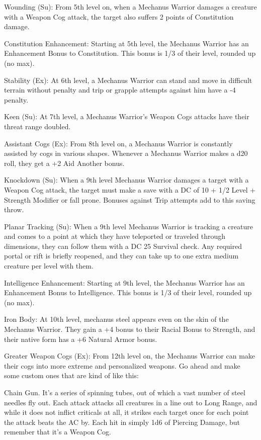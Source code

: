 Wounding (Su): From 5th level on, when a Mechanus Warrior damages a creature with a Weapon Cog attack, the target also suffers 2 points of Constitution damage.

Constitution Enhancement: Starting at 5th level, the Mechanus Warrior has an Enhancement Bonus to Constitution. This bonus is 1/3 of their level, rounded up (no max).

Stability (Ex): At 6th level, a Mechanus Warrior can stand and move in difficult terrain without penalty and trip or grapple attempts against him have a -4 penalty.

Keen (Su): At 7th level, a Mechanus Warrior's Weapon Cogs attacks have their threat range doubled.

Assistant Cogs (Ex): From 8th level on, a Mechanus Warrior is constantly assisted by cogs in various shapes. Whenever a Mechanus Warrior makes a d20 roll, they get a +2 Aid Another bonus.

Knockdown (Su): When a 9th level Mechanus Warrior damages a target with a Weapon Cog attack, the target must make a save with a DC of 10 + 1/2 Level + Strength Modifier or fall prone. Bonuses against Trip attempts add to this saving throw.

Planar Tracking (Su): When a 9th level Mechanus Warrior is tracking a creature and comes to a point at which they have teleported or traveled through dimensions, they can follow them with a DC 25 Survival check. Any required portal or rift is briefly reopened, and they can take up to one extra medium creature per level with them.

Intelligence Enhancement: Starting at 9th level, the Mechanus Warrior has an Enhancement Bonus to Intelligence. This bonus is 1/3 of their level, rounded up (no max).

Iron Body: At 10th level, mechanus steel appears even on the skin of the Mechanus Warrior. They gain a +4 bonus to their Racial Bonus to Strength, and their native form has a +6 Natural Armor bonus.

Greater Weapon Cogs (Ex): From 12th level on, the Mechanus Warrior can make their cogs into more extreme and personalized weapons. Go ahead and make some custom ones that are kind of like this:

    Chain Gun. It's a series of spinning tubes, out of which a vast number of steel needles fly out. Each attack attacks all creatures in a line out to Long Range, and while it does not inflict criticals at all, it strikes each target once for each point the attack beats the AC by. Each hit in simply 1d6 of Piercing Damage, but remember that it's a Weapon Cog.

